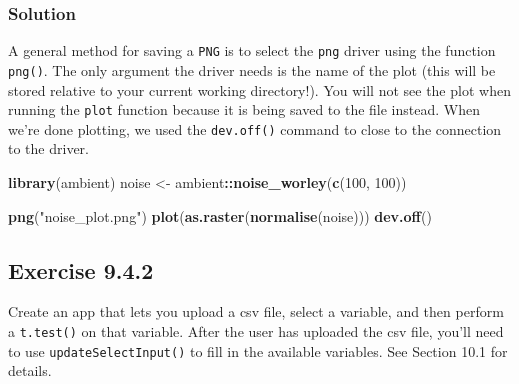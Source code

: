 \documentclass[]{book}
\newenvironment{Shaded}{\begin{snugshade}}{\end{snugshade}}
\newcommand{\DecValTok}[1]{\textcolor[rgb]{0.00,0.00,0.81}{#1}}
\newcommand{\KeywordTok}[1]{\textcolor[rgb]{0.13,0.29,0.53}{\textbf{#1}}}
\newcommand{\NormalTok}[1]{#1}
\newcommand{\OperatorTok}[1]{\textcolor[rgb]{0.81,0.36,0.00}{\textbf{#1}}}
\newcommand{\StringTok}[1]{\textcolor[rgb]{0.31,0.60,0.02}{#1}}
\begin{document}
\begin{solution}

\hypertarget{solution}{%
\subsubsection*{Solution}\label{solution}}

A general method for saving a \texttt{PNG} is to select the \texttt{png} driver using the function \texttt{png()}. The only argument the driver needs is the name of the plot (this will be stored relative to your current working directory!). You will not see the plot when running the \texttt{plot} function because it is being saved to the file instead. When we're done plotting, we used the \texttt{dev.off()} command to close to the connection to the driver.

\begin{Shaded}
\begin{Highlighting}[]
\KeywordTok{library}\NormalTok{(ambient)}
\NormalTok{noise <-}\StringTok{ }\NormalTok{ambient}\OperatorTok{::}\KeywordTok{noise_worley}\NormalTok{(}\KeywordTok{c}\NormalTok{(}\DecValTok{100}\NormalTok{, }\DecValTok{100}\NormalTok{))}

\KeywordTok{png}\NormalTok{(}\StringTok{"noise_plot.png"}\NormalTok{)}
\KeywordTok{plot}\NormalTok{(}\KeywordTok{as.raster}\NormalTok{(}\KeywordTok{normalise}\NormalTok{(noise)))}
\KeywordTok{dev.off}\NormalTok{()}
\end{Highlighting}
\end{Shaded}

\end{solution}

\hypertarget{exercise-9.4.2}{%
\subsection*{Exercise 9.4.2}\label{exercise-9.4.2}}

Create an app that lets you upload a csv file, select a variable, and then perform a \texttt{t.test()} on that variable. After the user has uploaded the csv file, you'll need to use \texttt{updateSelectInput()} to fill in the available variables. See Section 10.1 for details.
\end{document}

